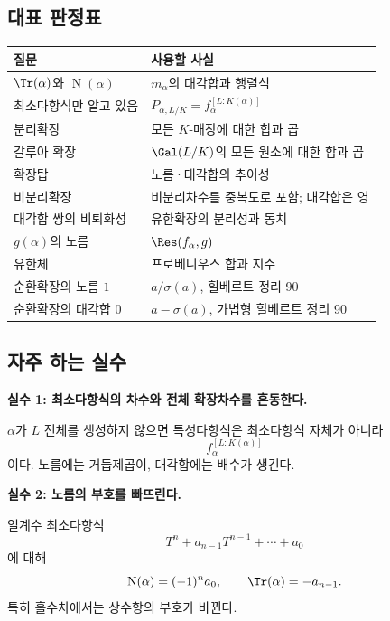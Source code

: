 \subsection{대표 판정표}

\begin{center}
\renewcommand{\arraystretch}{1.28}
\begin{tabular}{p{}p{}}
\toprule
질문 & 사용할 사실 \\
\midrule
$\Tr(\alpha)$와 $\operatorname N(\alpha)$ & $m_\alpha$의 대각합과 행렬식 \\
최소다항식만 알고 있음 & $P_{\alpha,L/K}=f_\alpha^{[L:K(\alpha)]}$ \\
분리확장 & 모든 $K$-매장에 대한 합과 곱 \\
갈루아 확장 & $\Gal(L/K)$의 모든 원소에 대한 합과 곱 \\
확장탑 & 노름·대각합의 추이성 \\
비분리확장 & 비분리차수를 중복도로 포함; 대각합은 영 \\
대각합 쌍의 비퇴화성 & 유한확장의 분리성과 동치 \\
$g(\alpha)$의 노름 & $\Res(f_\alpha,g)$ \\
유한체 & 프로베니우스 합과 지수 \\
순환확장의 노름 $1$ & $a/\sigma(a)$, 힐베르트 정리 90 \\
순환확장의 대각합 $0$ & $a-\sigma(a)$, 가법형 힐베르트 정리 90 \\
\bottomrule
\end{tabular}
\end{center}

\subsection{자주 하는 실수}

\begin{pitfall}
\textbf{실수 1: 최소다항식의 차수와 전체 확장차수를 혼동한다.}

$\alpha$가 $L$ 전체를 생성하지 않으면 특성다항식은 최소다항식 자체가 아니라
\[
  f_\alpha^{[L:K(\alpha)]}
\]
이다. 노름에는 거듭제곱이, 대각합에는 배수가 생긴다.
\end{pitfall}

\begin{pitfall}
\textbf{실수 2: 노름의 부호를 빠뜨린다.}

일계수 최소다항식
\[
  T^n+a_{n-1}T^{n-1}+\cdots+a_0
\]
에 대해
\[
  \operatorname N(\alpha)=(-1)^n a_0,
  \qquad
  \Tr(\alpha)=-a_{n-1}.
\]
특히 홀수차에서는 상수항의 부호가 바뀐다.
\end{pitfall}

